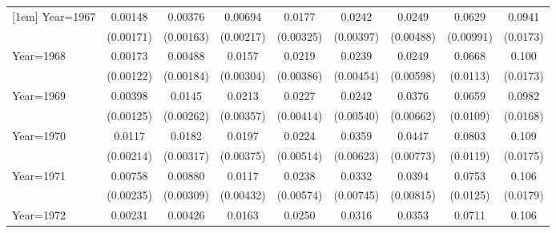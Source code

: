 \begin{table}[htbp]
\begin{tabular}{l*{8}{c}}
[1em]
Year=1967           &     0.00148         &     0.00376\sym{**} &     0.00694\sym{***}&      0.0177\sym{***}&      0.0242\sym{***}&      0.0249\sym{***}&      0.0629\sym{***}&      0.0941\sym{***}\\
                    &   (0.00171)         &   (0.00163)         &   (0.00217)         &   (0.00325)         &   (0.00397)         &   (0.00488)         &   (0.00991)         &    (0.0173)         \\
[1em]
Year=1968           &     0.00173         &     0.00488\sym{***}&      0.0157\sym{***}&      0.0219\sym{***}&      0.0239\sym{***}&      0.0249\sym{***}&      0.0668\sym{***}&       0.100\sym{***}\\
                    &   (0.00122)         &   (0.00184)         &   (0.00304)         &   (0.00386)         &   (0.00454)         &   (0.00598)         &    (0.0113)         &    (0.0173)         \\
[1em]
Year=1969           &     0.00398\sym{***}&      0.0145\sym{***}&      0.0213\sym{***}&      0.0227\sym{***}&      0.0242\sym{***}&      0.0376\sym{***}&      0.0659\sym{***}&      0.0982\sym{***}\\
                    &   (0.00125)         &   (0.00262)         &   (0.00357)         &   (0.00414)         &   (0.00540)         &   (0.00662)         &    (0.0109)         &    (0.0168)         \\
[1em]
Year=1970           &      0.0117\sym{***}&      0.0182\sym{***}&      0.0197\sym{***}&      0.0224\sym{***}&      0.0359\sym{***}&      0.0447\sym{***}&      0.0803\sym{***}&       0.109\sym{***}\\
                    &   (0.00214)         &   (0.00317)         &   (0.00375)         &   (0.00514)         &   (0.00623)         &   (0.00773)         &    (0.0119)         &    (0.0175)         \\
[1em]
Year=1971           &     0.00758\sym{***}&     0.00880\sym{***}&      0.0117\sym{***}&      0.0238\sym{***}&      0.0332\sym{***}&      0.0394\sym{***}&      0.0753\sym{***}&       0.106\sym{***}\\
                    &   (0.00235)         &   (0.00309)         &   (0.00432)         &   (0.00574)         &   (0.00745)         &   (0.00815)         &    (0.0125)         &    (0.0179)         \\
[1em]
Year=1972           &     0.00231         &     0.00426         &      0.0163\sym{***}&      0.0250\sym{***}&      0.0316\sym{***}&      0.0353\sym{***}&      0.0711\sym{***}&       0.106\sym{***}\\

\end{tabular}
\end{table}
